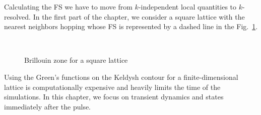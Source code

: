 Calculating the FS we have to move from $k$-independent local quantities to $k$-resolved. In the first part of the chapter, we consider a square lattice with the nearest neighbors hopping whose FS is represented by a dashed line in the Fig.~\ref{fig:BZ_sq_lat}.
\begin{figure}[h!]
 \\
\caption{Brillouin zone for a square lattice}
\label{fig:BZ_sq_lat}
\end{figure}
Using the Green's functions on the Keldysh contour for a finite-dimensional lattice is computationally expensive and heavily limits the time of the simulations. In this chapter, we focus on transient dynamics and states immediately after the pulse. 
